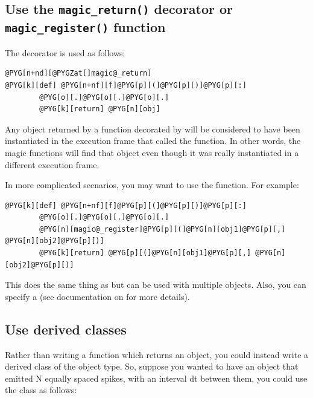 \documentclass[letterpaper,10pt,english]{manual}
\begin{document}
\subsection{Use the \texttt{magic\_return()} decorator or \texttt{magic\_register()} function}

The \hyperlink{brian.magic_return}{} decorator is used as follows:

\begin{Verbatim}[commandchars=@\[\]]
@PYG[n+nd][@PYGZat[]magic@_return]
@PYG[k][def] @PYG[n+nf][f]@PYG[p][(]@PYG[p][)]@PYG[p][:]
        @PYG[o][.]@PYG[o][.]@PYG[o][.]
        @PYG[k][return] @PYG[n][obj]
\end{Verbatim}

Any object returned by a function decorated by \hyperlink{brian.magic_return}{} will be
considered to have been instantiated in the execution frame that called the
function. In other words, the magic functions will find that object even
though it was really instantiated in a different execution frame.

In more complicated scenarios, you may want to use the \hyperlink{brian.magic_register}{}
function. For example:

\begin{Verbatim}[commandchars=@\[\]]
@PYG[k][def] @PYG[n+nf][f]@PYG[p][(]@PYG[p][)]@PYG[p][:]
        @PYG[o][.]@PYG[o][.]@PYG[o][.]
        @PYG[n][magic@_register]@PYG[p][(]@PYG[n][obj1]@PYG[p][,] @PYG[n][obj2]@PYG[p][)]
        @PYG[k][return] @PYG[p][(]@PYG[n][obj1]@PYG[p][,] @PYG[n][obj2]@PYG[p][)]
\end{Verbatim}

This does the same thing as \hyperlink{brian.magic_return}{} but can be used with
multiple objects. Also, you can specify a  (see documentation on
\hyperlink{brian.magic_register}{} for more details).

\subsection{Use derived classes}

Rather than writing a function which returns an object, you could instead
write a derived class of the object type. So, suppose you wanted to have an
object that emitted N equally spaced spikes, with an interval dt between
them, you could use the \hyperlink{brian.SpikeGeneratorGroup}{} class as follows:
\end{document}
